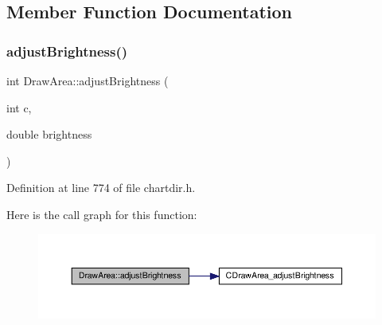 \subsection{Member Function Documentation}
\mbox{\label{class_draw_area_acd5523d6411d4d119a9f9723f8d1e4fb}} 
\subsubsection{\texorpdfstring{adjust\+Brightness()}{adjustBrightness()}}
{\footnotesize\ttfamily int Draw\+Area\+::adjust\+Brightness (\begin{DoxyParamCaption}\item[{int}]{c,  }\item[{double}]{brightness }\end{DoxyParamCaption})\hspace{0.3cm}{\ttfamily [inline]}}



Definition at line 774 of file chartdir.\+h.

Here is the call graph for this function\+:
\nopagebreak
\begin{figure}[H]
\begin{center}
\leavevmode
\includegraphics[width=350pt]{class_draw_area_acd5523d6411d4d119a9f9723f8d1e4fb_cgraph}
\end{center}
\end{figure}
\mbox{\label{class_draw_area_a343cccf1664650a3d120f58963ec0286}} 
